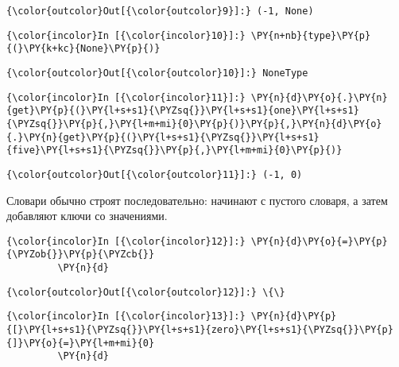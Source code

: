             \begin{Verbatim}[commandchars=\\\{\}]
{\color{outcolor}Out[{\color{outcolor}9}]:} (-1, None)
\end{Verbatim}
        
    \begin{Verbatim}[commandchars=\\\{\}]
{\color{incolor}In [{\color{incolor}10}]:} \PY{n+nb}{type}\PY{p}{(}\PY{k+kc}{None}\PY{p}{)}
\end{Verbatim}

            \begin{Verbatim}[commandchars=\\\{\}]
{\color{outcolor}Out[{\color{outcolor}10}]:} NoneType
\end{Verbatim}
        
    \begin{Verbatim}[commandchars=\\\{\}]
{\color{incolor}In [{\color{incolor}11}]:} \PY{n}{d}\PY{o}{.}\PY{n}{get}\PY{p}{(}\PY{l+s+s1}{\PYZsq{}}\PY{l+s+s1}{one}\PY{l+s+s1}{\PYZsq{}}\PY{p}{,}\PY{l+m+mi}{0}\PY{p}{)}\PY{p}{,}\PY{n}{d}\PY{o}{.}\PY{n}{get}\PY{p}{(}\PY{l+s+s1}{\PYZsq{}}\PY{l+s+s1}{five}\PY{l+s+s1}{\PYZsq{}}\PY{p}{,}\PY{l+m+mi}{0}\PY{p}{)}
\end{Verbatim}

            \begin{Verbatim}[commandchars=\\\{\}]
{\color{outcolor}Out[{\color{outcolor}11}]:} (-1, 0)
\end{Verbatim}
        
    Словари обычно строят последовательно: начинают с пустого словаря, а
затем добавляют ключи со значениями.

    \begin{Verbatim}[commandchars=\\\{\}]
{\color{incolor}In [{\color{incolor}12}]:} \PY{n}{d}\PY{o}{=}\PY{p}{\PYZob{}}\PY{p}{\PYZcb{}}
         \PY{n}{d}
\end{Verbatim}

            \begin{Verbatim}[commandchars=\\\{\}]
{\color{outcolor}Out[{\color{outcolor}12}]:} \{\}
\end{Verbatim}
        
    \begin{Verbatim}[commandchars=\\\{\}]
{\color{incolor}In [{\color{incolor}13}]:} \PY{n}{d}\PY{p}{[}\PY{l+s+s1}{\PYZsq{}}\PY{l+s+s1}{zero}\PY{l+s+s1}{\PYZsq{}}\PY{p}{]}\PY{o}{=}\PY{l+m+mi}{0}
         \PY{n}{d}
\end{Verbatim}

